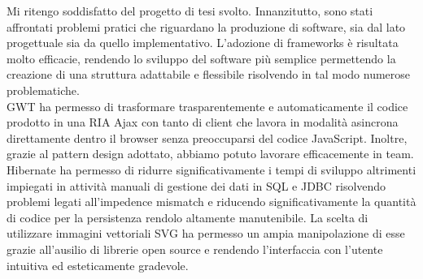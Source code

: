 Mi ritengo soddisfatto del progetto di tesi svolto.
Innanzitutto, sono stati affrontati
problemi pratici che riguardano la produzione di software, sia dal lato progettuale sia da quello implementativo.
L'adozione di frameworks è risultata molto efficacie, rendendo lo sviluppo del software più semplice permettendo la creazione di una struttura  adattabile e flessibile risolvendo in tal modo numerose problematiche.\\
GWT ha permesso di trasformare trasparentemente e automaticamente il codice prodotto in una RIA Ajax con tanto di client che lavora in modalità asincrona direttamente dentro il browser senza preoccuparsi del codice JavaScript.
Inoltre, grazie al pattern design adottato, abbiamo potuto lavorare efficacemente in team. \\
Hibernate ha permesso di ridurre significativamente i tempi  di sviluppo altrimenti impiegati in attività manuali di gestione dei dati in SQL e JDBC risolvendo problemi legati all'impedence mismatch e riducendo significativamente la quantità di codice per la persistenza rendolo altamente manutenibile.
La scelta di utilizzare immagini vettoriali SVG ha permesso un ampia manipolazione di esse grazie all'ausilio di librerie open source e rendendo l'interfaccia con l'utente intuitiva ed esteticamente gradevole.
